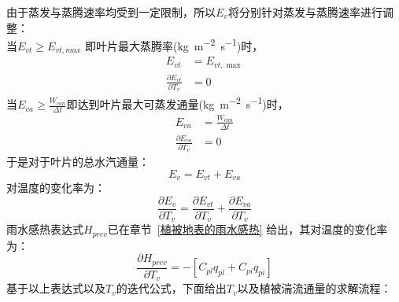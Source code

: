 由于蒸发与蒸腾速率均受到一定限制，所以$E_{v}$将分别针对蒸发与蒸腾速率进行调整：\\
当$ E_{vt} \geq E_{vt,max}$ 即叶片最大蒸腾率(\unit{kg.m^{-2}.s^{-1}})时，
\begin{equation}
\begin{aligned}
E_{vt} &=  E_{vt, \max } \\[1ex] 
\frac{\partial E_{vt}}{\partial T_{v}} &= 0
\end{aligned}
\end{equation}
当$E_{va} \geq \frac{W_{can}}{\Delta t}$即达到叶片最大可蒸发通量(\unit{kg.m^{-2}.s^{-1}})时，
\begin{equation}
  \begin{aligned}
   E_{va} &= \frac{W_{can}}{\Delta t} \\[1ex] 
   \frac{\partial E_{va}}{\partial T_{v}} &= 0
  \end{aligned}
\end{equation}
于是对于叶片的总水汽通量：
\begin{equation}
   E_{v} = E_{vt}+E_{va} 
\end{equation}
对温度的变化率为：
\begin{equation}
   \frac{\partial E_{v}}{\partial T_{v}} = \frac{\partial E_{vt}}{\partial T_{v}}+\frac{\partial E_{va}}{\partial T_{v}}
\end{equation}
雨水感热表达式$H_{prcv}$已在章节~\ref{植被地表的雨水感热} 给出，其对温度的变化率为：
\begin{equation}
\frac{\partial H_{prcv}}{\partial T_{v}}=-\left[C_{p l} q_{p l}+C_{p i} q_{p i}\right]
\end{equation}
基于以上表达式以及$T_v$的迭代公式，下面给出$T_v$以及植被湍流通量的求解流程：
